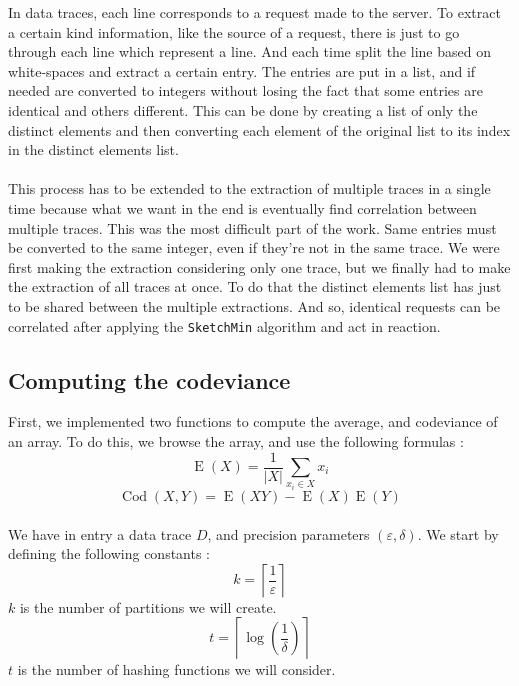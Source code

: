 \documentclass[a4paper]{article}%
\DeclareMathOperator{\E}{E}
\DeclareMathOperator{\Cod}{Cod}
\begin{document}
In data traces, each line corresponds to a request made to the server. To extract a certain kind information, like the source of a request, there is just to go through each line which represent a line. And each time split the line based on white-spaces and extract a certain entry. The entries are put in a list, and if needed are converted to integers without losing the fact that some entries are identical and others different. This can be done by creating a list of only the distinct elements and then converting each element of the original list to its index in the distinct elements list.

\paragraph{}This process has to be extended to the extraction of multiple traces in a single time because what we want in the end is eventually find correlation between multiple traces. This was the most difficult part of the work. Same entries must be converted to the same integer, even if they're not in the same trace. We were first making the extraction considering only one trace, but we finally had to make the extraction of all traces at once. To do that the distinct elements list has just to be shared between the multiple extractions. And so, identical requests can be correlated after applying the \texttt{SketchMin} algorithm and act in reaction.

\subsection{Computing the codeviance}

First, we implemented two functions to compute the average, and codeviance of an array. To do this, we browse the array, and use the following formulas :
	\[ \E(X) = \frac{1}{|X|} \sum\limits_{x_i \in X} x_i \]
	\[ \Cod(X,Y) = \E(XY) - \E(X)\E(Y) \]
	
\paragraph{}We have in entry a data trace $D$, and precision parameters $(\varepsilon, \delta)$. We start by defining the following constants :
	\[ k =\left\lceil \frac{1}{\varepsilon} \right\rceil \]
$k$ is the number of partitions we will create.
	\[ t = \left\lceil \log(\frac{1}{\delta}) \right\rceil \]
$t$ is the number of hashing functions we will consider.
	
\end{document}
